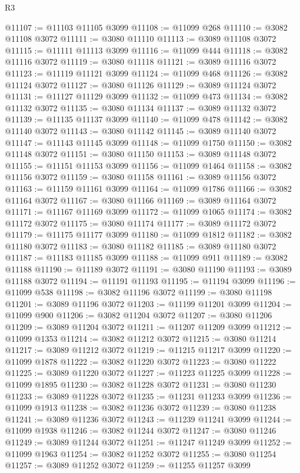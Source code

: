 \begin{lexlean}{R3}
\begin{coremodule}
@11107 := @11103 @11105 @3099
@11108 := @11099 @268
@11110 := @3082 @11108 @3072
@11111 := @3080 @11110
@11113 := @3089 @11108 @3072
@11115 := @11111 @11113 @3099
@11116 := @11099 @444
@11118 := @3082 @11116 @3072
@11119 := @3080 @11118
@11121 := @3089 @11116 @3072
@11123 := @11119 @11121 @3099
@11124 := @11099 @468
@11126 := @3082 @11124 @3072
@11127 := @3080 @11126
@11129 := @3089 @11124 @3072
@11131 := @11127 @11129 @3099
@11132 := @11099 @473
@11134 := @3082 @11132 @3072
@11135 := @3080 @11134
@11137 := @3089 @11132 @3072
@11139 := @11135 @11137 @3099
@11140 := @11099 @478
@11142 := @3082 @11140 @3072
@11143 := @3080 @11142
@11145 := @3089 @11140 @3072
@11147 := @11143 @11145 @3099
@11148 := @11099 @1750
@11150 := @3082 @11148 @3072
@11151 := @3080 @11150
@11153 := @3089 @11148 @3072
@11155 := @11151 @11153 @3099
@11156 := @11099 @1464
@11158 := @3082 @11156 @3072
@11159 := @3080 @11158
@11161 := @3089 @11156 @3072
@11163 := @11159 @11161 @3099
@11164 := @11099 @1786
@11166 := @3082 @11164 @3072
@11167 := @3080 @11166
@11169 := @3089 @11164 @3072
@11171 := @11167 @11169 @3099
@11172 := @11099 @1065
@11174 := @3082 @11172 @3072
@11175 := @3080 @11174
@11177 := @3089 @11172 @3072
@11179 := @11175 @11177 @3099
@11180 := @11099 @1812
@11182 := @3082 @11180 @3072
@11183 := @3080 @11182
@11185 := @3089 @11180 @3072
@11187 := @11183 @11185 @3099
@11188 := @11099 @911
@11189 := @3082 @11188
@11190 := @11189 @3072
@11191 := @3080 @11190
@11193 := @3089 @11188 @3072
@11194 := @11191 @11193
@11195 := @11194 @3099
@11196 := @11099 @538
@11198 := @3082 @11196 @3072
@11199 := @3080 @11198
@11201 := @3089 @11196 @3072
@11203 := @11199 @11201 @3099
@11204 := @11099 @900
@11206 := @3082 @11204 @3072
@11207 := @3080 @11206
@11209 := @3089 @11204 @3072
@11211 := @11207 @11209 @3099
@11212 := @11099 @1353
@11214 := @3082 @11212 @3072
@11215 := @3080 @11214
@11217 := @3089 @11212 @3072
@11219 := @11215 @11217 @3099
@11220 := @11099 @1878
@11222 := @3082 @11220 @3072
@11223 := @3080 @11222
@11225 := @3089 @11220 @3072
@11227 := @11223 @11225 @3099
@11228 := @11099 @1895
@11230 := @3082 @11228 @3072
@11231 := @3080 @11230
@11233 := @3089 @11228 @3072
@11235 := @11231 @11233 @3099
@11236 := @11099 @1913
@11238 := @3082 @11236 @3072
@11239 := @3080 @11238
@11241 := @3089 @11236 @3072
@11243 := @11239 @11241 @3099
@11244 := @11099 @1938
@11246 := @3082 @11244 @3072
@11247 := @3080 @11246
@11249 := @3089 @11244 @3072
@11251 := @11247 @11249 @3099
@11252 := @11099 @1963
@11254 := @3082 @11252 @3072
@11255 := @3080 @11254
@11257 := @3089 @11252 @3072
@11259 := @11255 @11257 @3099

\end{coremodule}
\end{lexlean}
